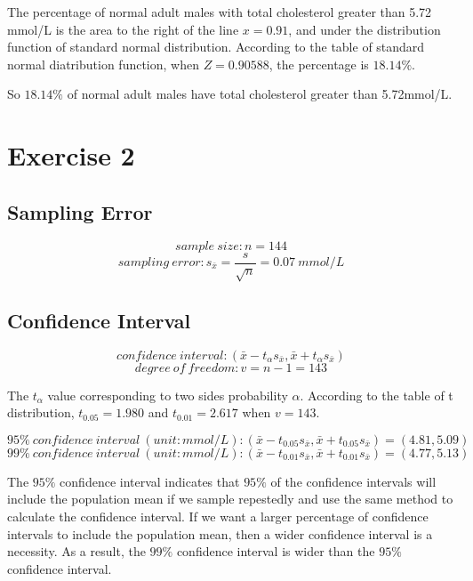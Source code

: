 \documentclass[11pt,a4paper,onside,UTF8]{article}
\begin{document}
The percentage of normal adult males with total cholesterol greater than 5.72 mmol/L is the area to the right of the line $x=0.91$, and under the 
distribution function of standard normal distribution. According to the table of standard normal diatribution function, when $Z = 0.90588$,
the percentage is $18.14\%$. 
 
So $18.14\%$ of normal adult males have total cholesterol greater than 5.72mmol/L.

\section{Exercise 2}
\subsection{Sampling Error}
\begin{equation}
	sample \ size: n = 144
\end{equation}
\begin{equation}
	sampling \ error: s_{\bar{x}}=\frac{s}{\sqrt{n}} = 0.07 \ mmol/L
\end{equation}

\subsection{Confidence Interval}
\begin{equation}
	confidence \ interval : (\bar{x}-t_\alpha s_{\bar{x}},\bar{x}+t_\alpha s_{\bar{x}})
\end{equation}
\begin{equation}
	degree \ of \ freedom : v=n-1=143
\end{equation}

The $t_\alpha$ value corresponding to two sides probability $\alpha$.
According to the table of t distribution, $t_{0.05} = 1.980$ and $t_{0.01} = 2.617$ when $v=143$.

\begin{equation}
	95\% \ confidence \ interval \ (unit:mmol/L): (\bar{x}-t_{0.05} s_{\bar{x}},\bar{x}+t_{0.05} s_{\bar{x}})=(4.81,5.09)
\end{equation}
\begin{equation}
	99\% \ confidence \ interval \ (unit:mmol/L): (\bar{x}-t_{0.01} s_{\bar{x}},\bar{x}+t_{0.01} s_{\bar{x}})=(4.77,5.13)
\end{equation}

The $95\%$ confidence interval indicates that $95\%$ of the confidence intervals will include the population mean if we sample repestedly 
and use the same method to calculate the confidence interval. If we want a larger percentage of confidence intervals to include the population mean,
then a wider confidence interval is a necessity. As a result, the $99\%$ confidence interval is wider than the $95\%$ confidence interval. 
\end{document}
